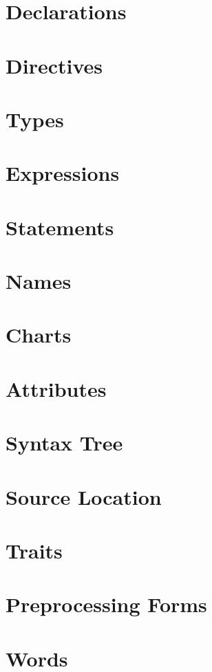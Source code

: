 \documentclass[letterpaper,10pt]{memoir}
\begin{document}
\chapter{Declarations}


\chapter{Directives}


\chapter{Types}


\chapter{Expressions}


\chapter{Statements}


\chapter{Names}


\chapter{Charts}


\chapter{Attributes}


\chapter{Syntax Tree}


\chapter{Source Location}


\chapter{Traits}


\chapter{Preprocessing Forms}


\chapter{Words}


\appendix
%

%



\end{document}

